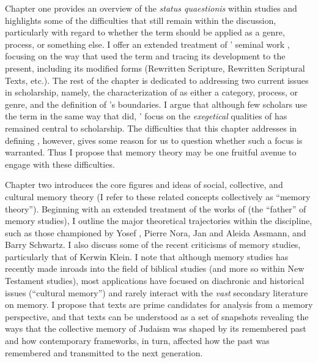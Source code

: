 Chapter one provides an overview of the \emph{status quaestionis} within \rwb studies and highlights some of the difficulties that still remain within the discussion, particularly with regard to whether the term should be applied as a genre, process, or something else. I offer an extended treatment of \vermes' seminal work , focusing on the way that \vermes used the term and tracing its development to the present, including its modified forms (Rewritten Scripture, Rewritten Scriptural Texts, etc.). The rest of the chapter is dedicated to addressing two current issues in \rwb scholarship, namely, the characterization of \rwb as either a category, process, or genre, and the definition of \rwb's boundaries. I argue that although few scholars use the term \rwb in the same way that \vermes did, \vermes' focus on the \emph{exegetical} qualities of \rwb has remained central to \rwb scholarship. The difficulties that this chapter addresses in defining \rwb, however, gives some reason for us to question whether such a focus is warranted. Thus I propose that memory theory may be one fruitful avenue to engage with these difficulties.

Chapter two introduces the core figures and ideas of social, collective, and cultural memory theory (I refer to these related concepts collectively as ``memory theory''). Beginning with an extended treatment of the works of \Halbwachs (the ``father'' of memory studies), I outline the major theoretical trajectories within the discipline, such as those championed by Yosef \yerushalmi, Pierre Nora, Jan and Aleida Assmann, and Barry Schwartz. I also discuss some of the recent criticisms of memory studies, particularly that of Kerwin Klein. I note that although memory studies has recently made inroads into the field of biblical studies (and more so within New Testament studies), most applications have focused on diachronic and historical issues (``cultural memory'') and rarely interact with the \emph{vast} secondary literature on memory. I propose that \rwb texts are prime candidates for analysis from a memory perspective, and that \rwb texts can be understood as a set of snapshots revealing the ways that the collective memory of \secondtemple Judaism was shaped by its remembered past and how contemporary frameworks, in turn, affected how the past was remembered and transmitted to the next generation.

